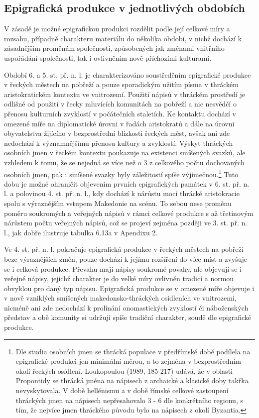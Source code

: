 \subsection[epigrafická-produkce-v-jednotlivých-obdobích]{Epigrafická produkce v jednotlivých obdobích}

V zásadě je možné epigrafickou produkci rozdělit podle její celkové míry a rozsahu, případně charakteru materiálu do několika období, v nichž dochází k zásadnějším proměnám společnosti, způsobených jak změnami vnitřního uspořádání společnosti, tak i ovlivněním nově příchozími kulturami.

Období 6. a 5. st. př. n. l. je charakterizováno soustředěním epigrafické produkce v řeckých městech na pobřeží a pouze sporadickým užitím písma v thráckém aristokratickém kontextu ve vnitrozemí. Použití nápisů v thráckém prostředí je odlišné od použití v řecky mluvících komunitách na pobřeží a nic nesvědčí o přenosu kulturních zvyklostí v počátečních staletích. Ke kontaktu dochází v omezené míře na diplomatické úrovni v řadách aristokratů a dále na úrovni obyvatelstva žijícího v bezprostřední blízkosti řeckých měst, avšak ani zde nedochází k významnějšímu přenosu kultury a zvyklostí. Výskyt thráckých osobních jmen v řeckém kontextu poukazuje na existenci smíšených svazků, ale vzhledem k tomu, že se nejedná se více než o 3  z celkového počtu dochovaných osobních jmen, pak i smíšené svazky byly záležitostí spíše výjimečnou.\footnote{Dle studia osobních jmen se thrácká populace v předřímské době podílela na epigrafické produkci jen minimální měrou, a to zejména v bezprostředním okolí řeckých osídlení. Loukopoulou (1989, 185-217) udává, že v oblasti Propontidy se thrácká jména na nápisech z archaické a klasické doby takřka nevyskytovala. V době hellénismu a v době římské celkové zastoupení thráckých jmen na nápisech nepřesahovalo 3 - 6  dle konkrétního regionu, s tím, že nejvíce jmen thráckého původu bylo na nápisech z okolí Byzantia.} Tuto dobu je možné ohraničit objevením prvních epigrafických památek v 6. st. př. n. l. a polovinou 4. st. př. n. l., kdy dochází k nárůstu moci thrácké aristokracie spolu s výraznějším vstupem Makedonie na scénu. To sebou nese proměnu poměru soukromých a veřejných nápisů v rámci celkové produkce s až třetinovým nárůstem počtu veřejných nápisů, což se projeví zejména později ve 3. st. př. n. l., jak dobře ilustruje tabulka 6.13a v Apendixu 2.

Ve 4. st. př. n. l. pokračuje epigrafická produkce v řeckých městech na pobřeží beze výraznějších změn, pouze dochází k jejímu rozšíření do více míst a zvyšuje se i celková produkce. Převahu mají nápisy soukromé povahy, ale objevují se i veřejné nápisy, jejichž charakter je do velké míry ovlivněn tradicí a normou obvyklou pro daný typ nápisu. Epigrafická produkce se v omezené míře objevuje i v nově vzniklých smíšených makedonsko-thráckých osídleních ve vnitrozemí, nicméně ani zde nedochází k prolínání onomastických zvyklostí či náboženských představ a obě komunity si udržují spíše tradiční charakter, soudě dle epigrafické produkce.

